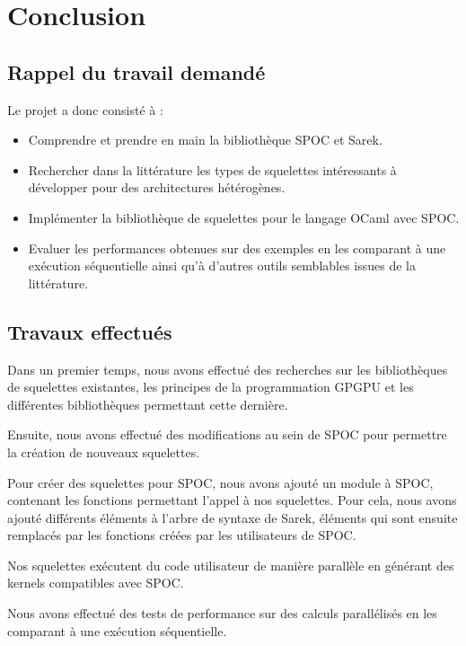 \documentclass{report}
\begin{document}
\chapter{Conclusion}
\section{Rappel du travail demandé}

Le projet a donc consisté à : \newline
\begin{itemize}
\item Comprendre et prendre en main la bibliothèque SPOC et Sarek.
\item Rechercher dans la littérature les types de squelettes intéressants à développer  pour des architectures hétérogènes.
\item Implémenter la bibliothèque de squelettes pour le langage OCaml avec SPOC.
\item Evaluer les performances obtenues sur des exemples en les comparant à une exécution séquentielle ainsi qu'à d'autres outils semblables issues de la littérature. 
\end{itemize}

\section{Travaux effectués}
Dans un premier temps, nous avons effectué des recherches sur les bibliothèques de squelettes existantes, les principes de la programmation GPGPU et les différentes bibliothèques permettant cette dernière.\newline

Ensuite, nous avons effectué des modifications au sein de SPOC pour permettre la création de nouveaux squelettes.\newline

Pour créer des squelettes pour SPOC, nous avons ajouté un module à SPOC, contenant les fonctions permettant l'appel à nos squelettes. Pour cela, nous avons ajouté différents éléments à l'arbre de syntaxe de Sarek, éléments qui sont ensuite remplacés par les fonctions créées par les utilisateurs de SPOC.\newline

Nos squelettes exécutent du code utilisateur de manière parallèle en générant des kernels compatibles avec SPOC.\newline

Nous avons effectué des tests de performance sur des calculs parallélisés en les comparant à une exécution séquentielle.\newline
\end{document}

